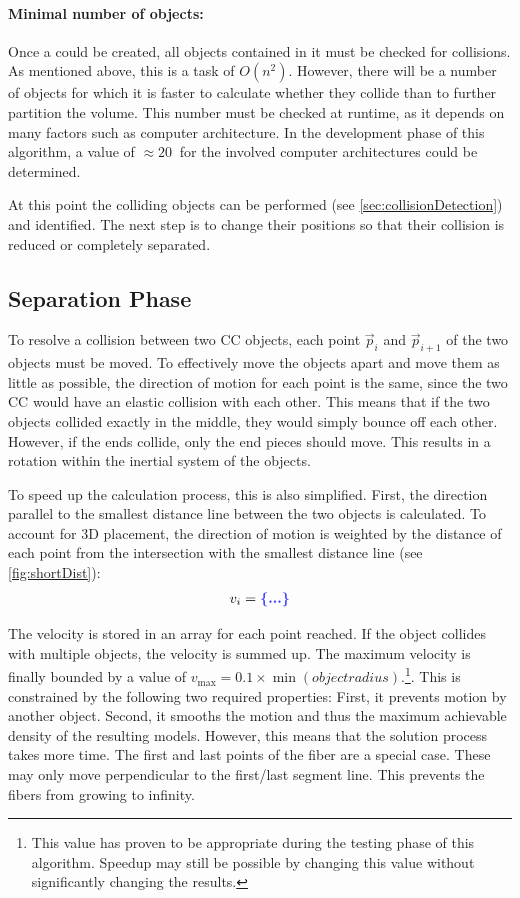 \paragraph{Minimal number of objects:}
Once a  could be created, all objects contained in it must be checked for collisions.
As mentioned above, this is a task of $O(n^2)$.
However, there will be a number of objects for which it is faster to calculate whether they collide than to further partition the volume.
This number must be checked at runtime, as it depends on many factors such as computer architecture.
In the development phase of this algorithm, a value of $\approx \SI{20}{}$ for the involved computer architectures could be determined.
\par
%
At this point the colliding objects can be performed (see \cref{sec:collisionDetection}) and identified.
The next step is to change their positions so that their collision is reduced or completely separated.
%
\subsection{Separation Phase}
To resolve a collision between two \ac{CC} objects, each point $\vec{p}_i$ and $\vec{p}_{i+1}$ of the two objects must be moved.
To effectively move the objects apart and move them as little as possible, the direction of motion for each point is the same, since the two \ac{CC} would have an elastic collision with each other.
This means that if the two objects collided exactly in the middle, they would simply bounce off each other.
However, if the ends collide, only the end pieces should move.
This results in a rotation within the inertial system of the objects.
\par
% 
To speed up the calculation process, this is also simplified.
First, the direction parallel to the smallest distance line between the two objects is calculated.
To account for 3D placement, the direction of motion is weighted by the distance of each point from the intersection with the smallest distance line (see \cref{fig:shortDist}):
\begin{align}
v_i = \dummy{}
\end{align}
\par
%
The velocity is stored in an array for each point reached.
If the object collides with multiple objects, the velocity is summed up.
The maximum velocity is finally bounded by a value of $v_{\max} = 0.1 \times \min(\mathit{object radius})$.\footnote{This value has proven to be appropriate during the testing phase of this algorithm. Speedup may still be possible by changing this value without significantly changing the results.}.
This is constrained by the following two required properties:
First, it prevents motion by another object.
Second, it smooths the motion and thus the maximum achievable density of the resulting models.
However, this means that the solution process takes more time.
The first and last points of the fiber are a special case.
These may only move perpendicular to the first/last segment line.
This prevents the fibers from growing to infinity.
%
